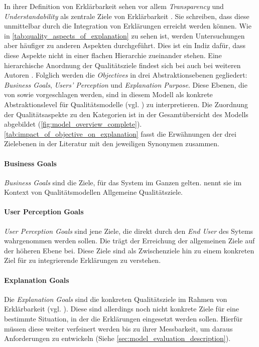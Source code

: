 In ihrer Definition von Erklärbarkeit sehen \citeauthor{chazette_knowledge_nodate} vor allem \textit{Transparency} und \textit{Understandability} als zentrale Ziele von Erklärbarkeit \cite{chazette_end-users_nodate}. Sie schreiben, dass diese unmittelbar durch die Integration von Erklärungen erreicht werden können. Wie in \autoref{tab:quality_aspects_of_explanation} zu sehen ist, werden Untersuchungen aber häufiger zu anderen Aspekten durchgeführt. Dies ist ein Indiz dafür, dass diese Aspekte nicht in einer flachen Hierarchie zueinander stehen. Eine hierarchische Anordnung der Qualitätsziele findest sich bei auch bei weiteren Autoren \cite{nunes_systematic_2017,tintarev2007survey}. Folglich werden die \textit{Objectives} in drei Abstraktionsebenen gegliedert: \textit{Business Goals}, \textit{Users' Perception} und \textit{Explanation Purpose}. Diese Ebenen, die von \citeauthor{nunes_systematic_2017} sowie \citeauthor{tintarev2007survey} vorgeschlagen werden, sind in diesem Modell als konkrete Abstraktionslevel für Qualitätsmodelle (vgl. \cite{schneider2012abenteuer}) zu interpretieren. Die Zuordnung der Qualitätsaspekte zu den Kategorien ist in der Gesamtübersicht des Modells abgebildet (\autoref{fig:model_overview_complete}). \autoref{tab:impact_of_objective_on_explanation} fasst die Erwähnungen der drei Zielebenen in der Literatur mit den jeweiligen Synonymen zusammen.

\paragraph{Business Goals} \textit{Business Goals} sind die Ziele, für das System im Ganzen gelten. \citeauthor{schneider2012abenteuer} nennt sie im Kontext von Qualitätsmodellen \glqq Allgemeine Qualitätsziele\grqq \cite{schneider2012abenteuer}.

\paragraph{User Perception Goals} \textit{User Perception Goals} sind jene Ziele, die direkt durch den \textit{End User} des Sytems wahrgenommen werden sollen. Die trägt der Erreichung der allgemeinen Ziele auf der höheren Ebene bei. Diese Ziele sind als Zwischenziele hin zu einem konkreten Ziel für zu integrierende Erklärungen zu verstehen.

\paragraph{Explanation Goals} Die \textit{Explanation Goals} sind die \glqq konkreten Qualitätsziele\grqq{} im Rahmen von Erklärbarkeit (vgl. \cite{schneider2012abenteuer}). Diese sind allerdings noch nicht konkrete Ziele für eine bestimmte Situation, in der die Erklärungen eingesetzt werden sollen. Hierfür müssen diese weiter verfeinert werden bis zu ihrer Messbarkeit, um daraus Anforderungen zu entwickeln (Siehe \autoref{sec:model_evaluation_description}).

